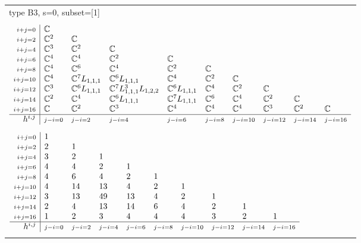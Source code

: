\documentclass[crop,border=2mm]{standalone}
\begin{document}
\begin{tabular}{l}
{\huge type B3, s=0, subset=[1]}\\ \\


$\displaystyle
\begin{array}{r|l l l l l l l l l}
	{\scriptstyle i+j=0}&\mathbb{C}&&&&&&&&\\
	{\scriptstyle i+j=2}&\mathbb{C}^{2}&\mathbb{C}&&&&&&&\\
	{\scriptstyle i+j=4}&\mathbb{C}^{3}&\mathbb{C}^{2}&\mathbb{C}&&&&&&\\
	{\scriptstyle i+j=6}&\mathbb{C}^{4}&\mathbb{C}^{4}&\mathbb{C}^{2}&\mathbb{C}&&&&&\\
	{\scriptstyle i+j=8}&\mathbb{C}^{4}&\mathbb{C}^{6}&\mathbb{C}^{4}&\mathbb{C}^{2}&\mathbb{C}&&&&\\
	{\scriptstyle i+j=10}&\mathbb{C}^{4}&\mathbb{C}^{7}L_{1,1,1}&\mathbb{C}^{6}L_{1,1,1}&\mathbb{C}^{4}&\mathbb{C}^{2}&\mathbb{C}&&&\\
	{\scriptstyle i+j=12}&\mathbb{C}^{3}&\mathbb{C}^{6}L_{1,1,1}&\mathbb{C}^{7}L_{1,1,1}^{3}L_{1,2,2}&\mathbb{C}^{6}L_{1,1,1}&\mathbb{C}^{4}&\mathbb{C}^{2}&\mathbb{C}&&\\
	{\scriptstyle i+j=14}&\mathbb{C}^{2}&\mathbb{C}^{4}&\mathbb{C}^{6}L_{1,1,1}&\mathbb{C}^{7}L_{1,1,1}&\mathbb{C}^{6}&\mathbb{C}^{4}&\mathbb{C}^{2}&\mathbb{C}&\\
	{\scriptstyle i+j=16}&\mathbb{C}&\mathbb{C}^{2}&\mathbb{C}^{3}&\mathbb{C}^{4}&\mathbb{C}^{4}&\mathbb{C}^{4}&\mathbb{C}^{3}&\mathbb{C}^{2}&\mathbb{C}\\
	\hline h^{i,j}&{\scriptstyle j-i=0}&{\scriptstyle j-i=2}&{\scriptstyle j-i=4}&{\scriptstyle j-i=6}&{\scriptstyle j-i=8}&{\scriptstyle j-i=10}&{\scriptstyle j-i=12}&{\scriptstyle j-i=14}&{\scriptstyle j-i=16}
\end{array}
$ \\ \\


$\displaystyle
\begin{array}{r|l l l l l l l l l}
	{\scriptstyle i+j=0}&1&&&&&&&&\\
	{\scriptstyle i+j=2}&2&1&&&&&&&\\
	{\scriptstyle i+j=4}&3&2&1&&&&&&\\
	{\scriptstyle i+j=6}&4&4&2&1&&&&&\\
	{\scriptstyle i+j=8}&4&6&4&2&1&&&&\\
	{\scriptstyle i+j=10}&4&14&13&4&2&1&&&\\
	{\scriptstyle i+j=12}&3&13&49&13&4&2&1&&\\
	{\scriptstyle i+j=14}&2&4&13&14&6&4&2&1&\\
	{\scriptstyle i+j=16}&1&2&3&4&4&4&3&2&1\\
	\hline h^{i,j}&{\scriptstyle j-i=0}&{\scriptstyle j-i=2}&{\scriptstyle j-i=4}&{\scriptstyle j-i=6}&{\scriptstyle j-i=8}&{\scriptstyle j-i=10}&{\scriptstyle j-i=12}&{\scriptstyle j-i=14}&{\scriptstyle j-i=16}
\end{array}
$ \\ \\



\end{tabular}
\end{document}
